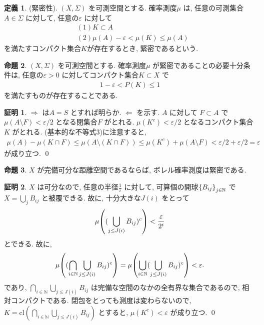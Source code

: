 \documentclass[10pt, fleqn, label-section=none]{bxjsarticle}
\theoremstyle{definition}
\newtheorem{dfn}{定義}[section]
\newtheorem{prop}[dfn]{命題}
\newtheorem*{pf*}{証明}
\newcommand{\veps}{\varepsilon}
\newcommand{\paren}[1]{\mleft( #1\mright )}
\newcommand{\cbra}[1]{\mleft\{#1\mright\}}
\newcommand{\naraba}{\Rightarrow}
\newcommand{\gyaku}{\Leftarrow}
\renewcommand{\;}{\, ; \,}
\begin{document}
\begin{dfn}(緊密性). 
$(X, \Sigma)$ を可測空間とする. 確率測度$\mu$ は, 任意の可測集合$A \in \Sigma$ に対して, 任意の$\veps$ に対して
\begin{align*} &(1)K\subset A \\ &(2) \mu(A) - \veps < \mu(K) \leq \mu(A) \end{align*}
を満たすコンパクト集合$K$が存在するとき, 緊密であるという. 

\end{dfn}

\begin{prop}
$(X, \Sigma)$ を可測空間とする. 確率測度$\mu$ が緊密であることの必要十分条件は, 
任意の$\veps > 0$ に対してコンパクト集合$K \subset X$ で 
\begin{align*} 1 - \veps < P(K) \leq 1 \end{align*}
を満たすものが存在することである.
\end{prop}
\begin{pf*}
$\naraba$ は$A = S$ とすれば明らか. $\gyaku$ を示す. $A$ に対して
$F \subset A $ で$\mu (A \setminus F) < \veps / 2$ となる閉集合$F$ がとれる. $\mu(K^c) < \veps / 2$ となるコンパクト集合$K$ がとれる. (基本的な不等式$3$)に注意すると, 
\begin{align*} \mu(A) - \mu(K \cap F ) \leq \mu(A \setminus (K \cap F)) \leq \mu(K^c) + \mu(A \setminus F)  < \veps/2 + \veps /2 =  \veps \end{align*}
が成り立つ.
\qed
\end{pf*}



\begin{prop}
$X$ が完備可分な距離空間であるならば, ボレル確率測度は緊密である. 
\end{prop}
\begin{pf*}
$X$ は可分なので, 任意の半径$\frac{1}{i}$ に対して, 可算個の開球$\cbra{B_{ij}}_{j \in \mathbb N}$ で$X = \bigcup_j B_{ij}$ と被覆できる. 故に, 十分大きな$J(i)$ をとって
\begin{align*} \mu \paren{   ( \bigcup_{j \leq J(i)} B_{ij} )^c   } < \frac{\veps}{2^i} \end{align*}
とできる. 故に,
\begin{align*} \mu \paren{ (\bigcap_{i \in \mathbb N}   \bigcup_{j \leq J(i)} B_{ij} )^c }  =  \mu \paren{ \bigcup_{i \in \mathbb N}  ( \bigcup_{j \leq J(i)} B_{ij} )^c }  < \veps .
  \end{align*}
 であり, $\bigcap_{i \in \mathbb N}   \bigcup_{j \leq J(i)} B_{ij}  $ は完備な空間のなかの全有界な集合であるので, 相対コンパクトである. 閉包をとっても測度は変わらないので, $K = \textrm{cl}(\bigcap_{i \in \mathbb N}   \bigcup_{j \leq J(i)} B_{ij})$ とすると, $\mu(K^c) < \veps$ が成り立つ.
\qed
\end{pf*}
\end{document}
